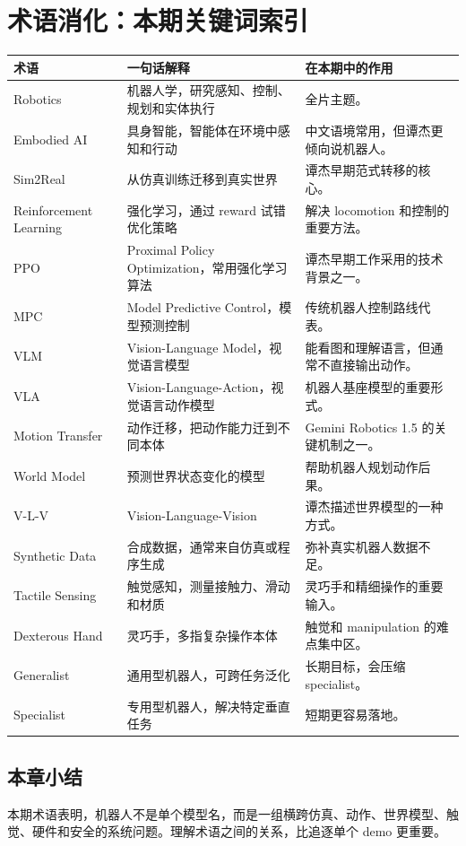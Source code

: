 \section{术语消化：本期关键词索引}

\begin{longtable}{p{}p{}p{}}
\toprule
术语 & 一句话解释 & 在本期中的作用 \\
\midrule
Robotics & 机器人学，研究感知、控制、规划和实体执行 & 全片主题。 \\
Embodied AI & 具身智能，智能体在环境中感知和行动 & 中文语境常用，但谭杰更倾向说机器人。 \\
Sim2Real & 从仿真训练迁移到真实世界 & 谭杰早期范式转移的核心。 \\
Reinforcement Learning & 强化学习，通过 reward 试错优化策略 & 解决 locomotion 和控制的重要方法。 \\
PPO & Proximal Policy Optimization，常用强化学习算法 & 谭杰早期工作采用的技术背景之一。 \\
MPC & Model Predictive Control，模型预测控制 & 传统机器人控制路线代表。 \\
VLM & Vision-Language Model，视觉语言模型 & 能看图和理解语言，但通常不直接输出动作。 \\
VLA & Vision-Language-Action，视觉语言动作模型 & 机器人基座模型的重要形式。 \\
Motion Transfer & 动作迁移，把动作能力迁到不同本体 & Gemini Robotics 1.5 的关键机制之一。 \\
World Model & 预测世界状态变化的模型 & 帮助机器人规划动作后果。 \\
V-L-V & Vision-Language-Vision & 谭杰描述世界模型的一种方式。 \\
Synthetic Data & 合成数据，通常来自仿真或程序生成 & 弥补真实机器人数据不足。 \\
Tactile Sensing & 触觉感知，测量接触力、滑动和材质 & 灵巧手和精细操作的重要输入。 \\
Dexterous Hand & 灵巧手，多指复杂操作本体 & 触觉和 manipulation 的难点集中区。 \\
Generalist & 通用型机器人，可跨任务泛化 & 长期目标，会压缩 specialist。 \\
Specialist & 专用型机器人，解决特定垂直任务 & 短期更容易落地。 \\
\bottomrule
\end{longtable}

\subsection{本章小结}

本期术语表明，机器人不是单个模型名，而是一组横跨仿真、动作、世界模型、触觉、硬件和安全的系统问题。理解术语之间的关系，比追逐单个 demo 更重要。

